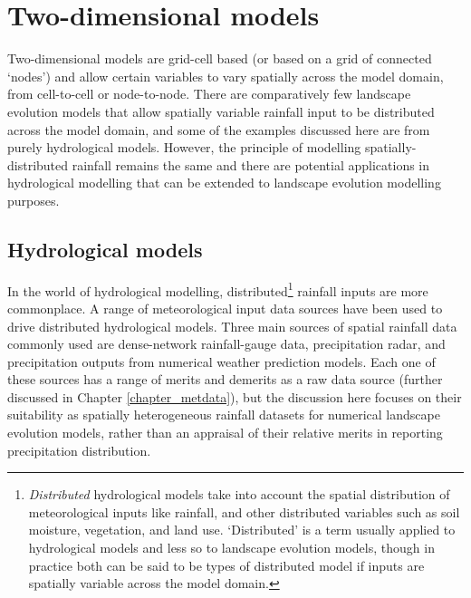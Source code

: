 
\section{Two-dimensional models}
Two-dimensional models are grid-cell based (or based on a grid of connected `nodes') and allow certain variables to vary spatially across the model domain, from cell-to-cell or node-to-node. There are comparatively few landscape evolution models that allow spatially variable rainfall input to be distributed across the model domain, and some of the examples discussed here are from purely hydrological models. However, the principle of modelling spatially-distributed rainfall remains the same and there are potential applications in hydrological modelling that can be extended to landscape evolution modelling purposes. 

\subsection{Hydrological models}
In the world of hydrological modelling, distributed\footnote{\textit{Distributed} hydrological models take into account the spatial distribution of meteorological inputs like rainfall, and other distributed variables such as soil moisture, vegetation, and land use. `Distributed' is a term usually applied to hydrological models and less so to landscape evolution models, though in practice both can be said to be types of distributed model if inputs are spatially variable across the model domain.} rainfall inputs are more commonplace. A range of meteorological input data sources have been used to drive distributed hydrological models. Three main sources of spatial rainfall data commonly used are dense-network rainfall-gauge data, precipitation radar, and precipitation outputs from numerical weather prediction models. Each one of these sources has a range of merits and demerits as a raw data source (further discussed in Chapter \ref{chapter_metdata}), but the discussion here focuses on their suitability as spatially heterogeneous rainfall datasets for numerical landscape evolution models, rather than an appraisal of their relative merits in reporting precipitation distribution.

